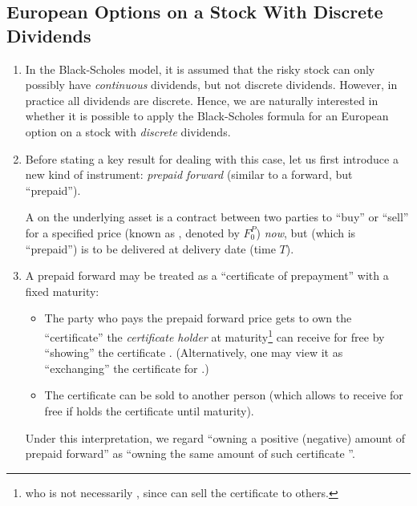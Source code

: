 \subsection{European Options on a Stock With Discrete Dividends}
\begin{enumerate}
\item In the Black-Scholes model, it is assumed that the risky stock
 can only possibly have \emph{continuous} dividends, but not
discrete dividends. However, in practice all dividends are discrete. Hence, we
are naturally interested in whether it is possible to apply the Black-Scholes
formula for an European option on a stock with \emph{discrete} dividends.

\item Before stating a key result for dealing with this case, let us first
introduce a new kind of instrument: \emph{prepaid forward} (similar to a
forward, but ``prepaid'').

A  on the underlying asset  is a
contract between two parties to ``buy'' or ``sell''  for a
specified price (known as , denoted by \(F_0^P\))
\emph{now}, but  (which is ``prepaid'') is to be delivered at
delivery date (time \(T\)).

\item A prepaid forward may be treated as a ``certificate of prepayment''
  with a fixed maturity:
\begin{itemize}
\item The party {\color{violet}} who pays the prepaid forward
price gets to own the ``certificate''   the
\emph{certificate holder} at maturity\footnote{who is not necessarily
{\color{violet}}, since {\color{violet}} can
sell the certificate  to others.} can receive 
for free by ``showing'' the certificate . (Alternatively, one may view it as
``exchanging'' the certificate  for .)
\item The certificate  can be sold to another person
 (which allows  to receive  for free if
 holds the certificate  until maturity).
\end{itemize}
Under this interpretation, we regard ``owning a positive (negative) amount of
prepaid forward'' as ``owning the same amount of such certificate
''.


\end{enumerate}
